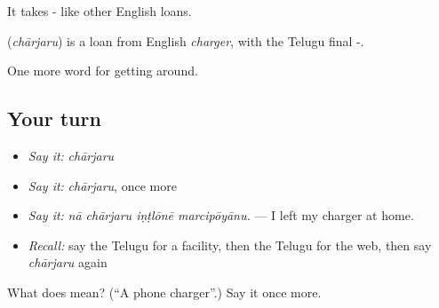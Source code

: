 It takes - like other English loans.

\begin{cousinweb}
\textbf{} (\emph{chārjaru}) is a loan from English \emph{charger}, with the Telugu final -.
\end{cousinweb}

\begin{grammarlens}[title={What you've built}]
One more word for getting around.
\end{grammarlens}

\subsection*{Your turn}
\begin{itemize}
\raggedright
  \item \emph{Say it:} \emph{chārjaru}
  \item \emph{Say it:} \emph{chārjaru}, once more
  \item \emph{Say it:} \emph{nā chārjaru iṇṭlōnē marcipōyānu.} — I left my charger at home.
  \item \emph{Recall:} say the Telugu for a facility, then the Telugu for the web, then say \emph{chārjaru} again
\end{itemize}

\begin{tcolorbox}[breakable,colback=teal!4,colframe=teal!35!black,title={Before you move on}]
What does  mean? (\textquotedblleft{}A phone charger\textquotedblright{}.) Say it once more.
\end{tcolorbox}
